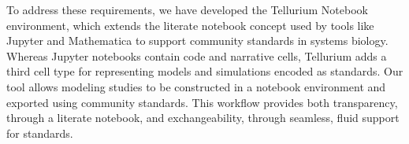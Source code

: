 \documentclass[10pt,letterpaper]{article}
\begin{document}
To address these requirements, we have developed the Tellurium Notebook environment, which extends the literate notebook concept used by tools like Jupyter \cite{ragan2014jupyter} and Mathematica \cite{wolfram1996mathematica} to support community standards in systems biology. Whereas Jupyter notebooks contain code and narrative cells, Tellurium adds a third cell type for representing models and simulations encoded as standards. Our tool allows modeling studies to be constructed in a notebook environment and exported using community standards. This workflow %
provides both transparency, through a literate notebook, and exchangeability, through seamless, fluid support for standards. %


\end{document}
